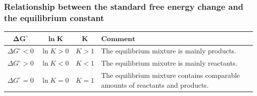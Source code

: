 \documentclass[11pt]{article}
\begin{document}
\subsubsection{Relationship between the standard free energy change and the equilibrium constant}
\label{sec:orgfb0e331}

\begin{center}
\begin{tabular}{c|c|c|m{20em}}
\(\boldsymbol{\Delta G^{\circ}}\) & \(\boldsymbol{\ln K}\) & \(\boldsymbol{K}\) & \(\textbf{Comment}\) \\
\hline
\(\Delta G^{\circ} < 0\) & \(\ln K > 0\) & \(K > 1\) & The equilibrium mixture is mainly products. \\
\(\Delta G^{\circ} > 0\) & \(\ln K < 0\) & \(K < 1\) & The equilibrium mixutre is mainly reactants. \\
\(\Delta G^{\circ} = 0\) & \(\ln K = 0\) & \(K = 1\) & The equilibrium mixture contains comparable amounts of reactants and products.
\end{tabular}
\end{center}
\end{document}

